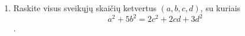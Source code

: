 \begin{enumerate}
    	
  \item Raskite visus sveikųjų skaičių ketvertus $(a,b,c,d)$, su kuriais
    $$a^2 + 5b^2 = 2c^2 + 2cd + 3d^2$$.
\end{enumerate}
